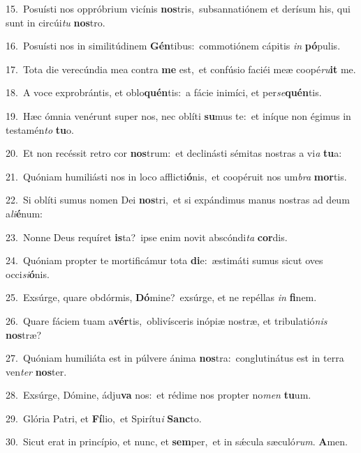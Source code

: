 {\numbfont\textcolor{\numbcolor}{15.}}~Posuísti nos oppróbrium vicínis \textbf{nos}\-tris,~\star subsannatiónem et derísum his, qui sunt in circúi\textit{tu} \textbf{nos}\-tro.\par
{\numbfont\textcolor{\numbcolor}{16.}}~Posuísti nos in similitúdinem \textbf{Gén}\-tibus:~\star commotiónem cápitis \textit{in} \textbf{pó}\-pulis.\par
{\numbfont\textcolor{\numbcolor}{17.}}~Tota die verecúndia mea contra \textbf{me} est,~\star et confúsio faciéi meæ coopé\-\textit{ru}\-\textbf{it} me.\par
{\numbfont\textcolor{\numbcolor}{18.}}~A voce exprobrántis, et oblo\-\textbf{quén}\-tis:~\star a fácie inimíci, et per\-\textit{se}\-\textbf{quén}tis.\par
{\numbfont\textcolor{\numbcolor}{19.}}~Hæc ómnia venérunt super nos, nec oblíti \textbf{su}\-mus te:~\star et iníque non égimus in testamén\textit{to} \textbf{tu}\-o.\par
{\numbfont\textcolor{\numbcolor}{20.}}~Et non recéssit retro cor \textbf{nos}\-trum:~\star et declinásti sémitas nostras a vi\textit{a} \textbf{tu}\-a:\par
{\numbfont\textcolor{\numbcolor}{21.}}~Quóniam humiliásti nos in loco afflicti\-\textbf{ó}\-nis,~\star et coopéruit nos um\textit{bra} \textbf{mor}\-tis.\par
{\numbfont\textcolor{\numbcolor}{22.}}~Si oblíti sumus nomen Dei \textbf{nos}\-tri,~\star et si expándimus manus nostras ad deum a\-\textit{li}\-\textbf{é}num:\par
{\numbfont\textcolor{\numbcolor}{23.}}~Nonne Deus requíret \textbf{is}\-ta?~\star ipse enim novit abscóndi\textit{ta} \textbf{cor}\-dis.\par
{\numbfont\textcolor{\numbcolor}{24.}}~Quóniam propter te mortificámur tota \textbf{di}\-e:~\star æstimáti sumus sicut oves occi\-\textit{si}\-\textbf{ó}nis.\par
{\numbfont\textcolor{\numbcolor}{25.}}~Exsúrge, quare obdórmis, \textbf{Dó}\-mine?~\star exsúrge, et ne repéllas \textit{in} \textbf{fi}\-nem.\par
{\numbfont\textcolor{\numbcolor}{26.}}~Quare fáciem tuam a\-\textbf{vér}\-tis,~\star oblivísceris inópiæ nostræ, et tribulatió\textit{nis} \textbf{nos}\-træ?\par
{\numbfont\textcolor{\numbcolor}{27.}}~Quóniam humiliáta est in púlvere ánima \textbf{nos}\-tra:~\star conglutinátus est in terra ven\textit{ter} \textbf{nos}\-ter.\par
{\numbfont\textcolor{\numbcolor}{28.}}~Exsúrge, Dómine, ádju\textbf{va} nos:~\star et rédime nos propter no\textit{men} \textbf{tu}\-um.\par
{\numbfont\textcolor{\numbcolor}{29.}}~Glória Patri, et \textbf{Fí}\-lio,~\star et Spirítu\textit{i} \textbf{Sanc}\-to.\par
{\numbfont\textcolor{\numbcolor}{30.}}~Sicut erat in princípio, et nunc, et \textbf{sem}\-per,~\star et in sǽcula sæculó\-\textit{rum}\-. \textbf{A}\-men.\par
